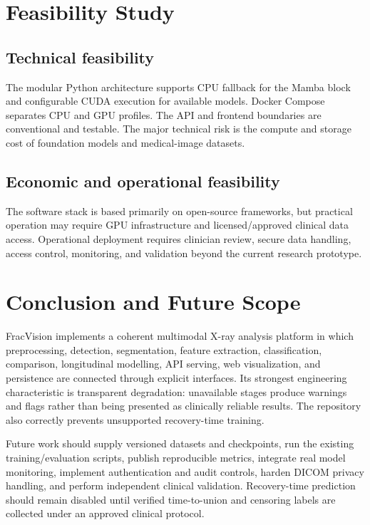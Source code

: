 \documentclass[12pt,a4paper]{article}
\begin{document}
\section{Feasibility Study}
\subsection{Technical feasibility}
The modular Python architecture supports CPU fallback for the Mamba block and configurable CUDA execution for available models. Docker Compose separates CPU and GPU profiles. The API and frontend boundaries are conventional and testable. The major technical risk is the compute and storage cost of foundation models and medical-image datasets.

\subsection{Economic and operational feasibility}
The software stack is based primarily on open-source frameworks, but practical operation may require GPU infrastructure and licensed/approved clinical data access. Operational deployment requires clinician review, secure data handling, access control, monitoring, and validation beyond the current research prototype.

\section{Conclusion and Future Scope}
FracVision implements a coherent multimodal X-ray analysis platform in which preprocessing, detection, segmentation, feature extraction, classification, comparison, longitudinal modelling, API serving, web visualization, and persistence are connected through explicit interfaces. Its strongest engineering characteristic is transparent degradation: unavailable stages produce warnings and flags rather than being presented as clinically reliable results. The repository also correctly prevents unsupported recovery-time training.

Future work should supply versioned datasets and checkpoints, run the existing training/evaluation scripts, publish reproducible metrics, integrate real model monitoring, implement authentication and audit controls, harden DICOM privacy handling, and perform independent clinical validation. Recovery-time prediction should remain disabled until verified time-to-union and censoring labels are collected under an approved clinical protocol.
\end{document}
